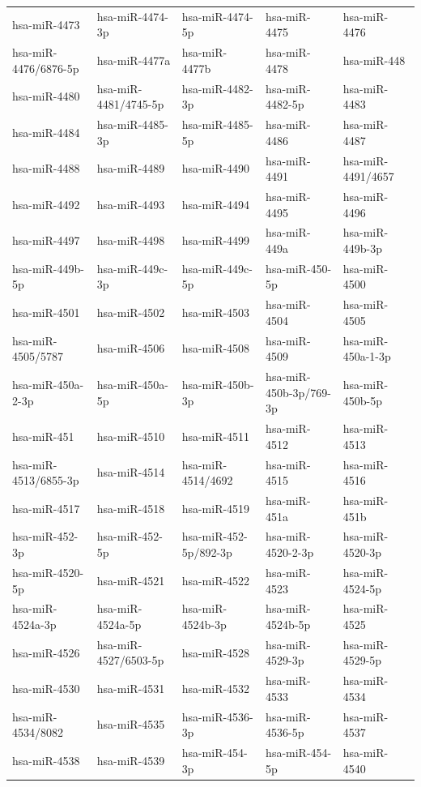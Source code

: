 \begin{longtable}{lllll}
hsa-miR-4473 & hsa-miR-4474-3p & hsa-miR-4474-5p & hsa-miR-4475 & hsa-miR-4476 \\
hsa-miR-4476/6876-5p & hsa-miR-4477a & hsa-miR-4477b & hsa-miR-4478 & hsa-miR-448 \\
hsa-miR-4480 & hsa-miR-4481/4745-5p & hsa-miR-4482-3p & hsa-miR-4482-5p & hsa-miR-4483 \\
hsa-miR-4484 & hsa-miR-4485-3p & hsa-miR-4485-5p & hsa-miR-4486 & hsa-miR-4487 \\
hsa-miR-4488 & hsa-miR-4489 & hsa-miR-4490 & hsa-miR-4491 & hsa-miR-4491/4657 \\
hsa-miR-4492 & hsa-miR-4493 & hsa-miR-4494 & hsa-miR-4495 & hsa-miR-4496 \\
hsa-miR-4497 & hsa-miR-4498 & hsa-miR-4499 & hsa-miR-449a & hsa-miR-449b-3p \\
hsa-miR-449b-5p & hsa-miR-449c-3p & hsa-miR-449c-5p & hsa-miR-450-5p & hsa-miR-4500 \\
hsa-miR-4501 & hsa-miR-4502 & hsa-miR-4503 & hsa-miR-4504 & hsa-miR-4505 \\
hsa-miR-4505/5787 & hsa-miR-4506 & hsa-miR-4508 & hsa-miR-4509 & hsa-miR-450a-1-3p \\
hsa-miR-450a-2-3p & hsa-miR-450a-5p & hsa-miR-450b-3p & hsa-miR-450b-3p/769-3p & hsa-miR-450b-5p \\
hsa-miR-451 & hsa-miR-4510 & hsa-miR-4511 & hsa-miR-4512 & hsa-miR-4513 \\
hsa-miR-4513/6855-3p & hsa-miR-4514 & hsa-miR-4514/4692 & hsa-miR-4515 & hsa-miR-4516 \\
hsa-miR-4517 & hsa-miR-4518 & hsa-miR-4519 & hsa-miR-451a & hsa-miR-451b \\
hsa-miR-452-3p & hsa-miR-452-5p & hsa-miR-452-5p/892-3p & hsa-miR-4520-2-3p & hsa-miR-4520-3p \\
hsa-miR-4520-5p & hsa-miR-4521 & hsa-miR-4522 & hsa-miR-4523 & hsa-miR-4524-5p \\
hsa-miR-4524a-3p & hsa-miR-4524a-5p & hsa-miR-4524b-3p & hsa-miR-4524b-5p & hsa-miR-4525 \\
hsa-miR-4526 & hsa-miR-4527/6503-5p & hsa-miR-4528 & hsa-miR-4529-3p & hsa-miR-4529-5p \\
hsa-miR-4530 & hsa-miR-4531 & hsa-miR-4532 & hsa-miR-4533 & hsa-miR-4534 \\
hsa-miR-4534/8082 & hsa-miR-4535 & hsa-miR-4536-3p & hsa-miR-4536-5p & hsa-miR-4537 \\
hsa-miR-4538 & hsa-miR-4539 & hsa-miR-454-3p & hsa-miR-454-5p & hsa-miR-4540 \\

\end{longtable}
